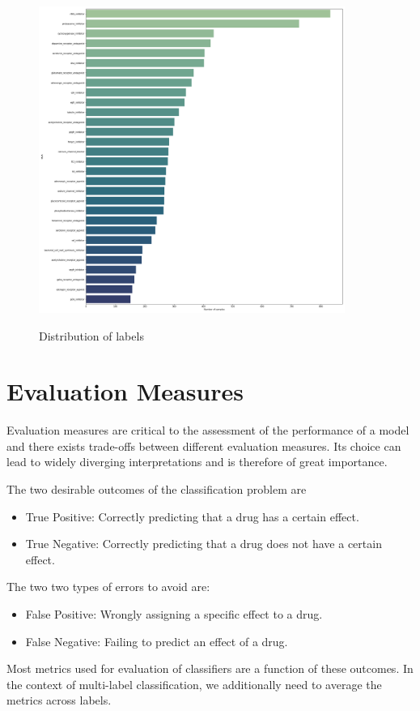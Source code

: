 \documentclass[bsc,frontabs,twoside,singlespacing,parskip,deptreport]{infthesis}     %
\let\Oldsection\section
\renewcommand{\section}{\FloatBarrier\Oldsection}
\begin{document}
\begin{figure}[h!]
\centering
\caption{Distribution of labels}
\includegraphics[height=10cm]{images/label_dist.png}\label{label_dist}
\end{figure}
\section{Evaluation Measures}
Evaluation measures are critical to the assessment of the performance of a model and there exists trade-offs between different evaluation measures. Its choice can lead to widely diverging interpretations and is therefore of great importance.

The two desirable outcomes of the classification problem are 
\begin{itemize}
    \item True Positive: Correctly predicting that a drug has a certain effect.
    \item True Negative: Correctly predicting that a drug does not have a certain effect.
\end{itemize}

The two two types of errors to avoid are:
\begin{itemize}
    \item False Positive: Wrongly assigning a specific effect to a drug.
    \item False Negative: Failing to predict an effect of a drug.
\end{itemize}

Most metrics used for evaluation of classifiers are a function of these outcomes. In the context of multi-label classification, we additionally need to average the metrics across labels.
\end{document}
